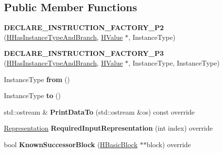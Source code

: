 \subsection*{Public Member Functions}
\begin{DoxyCompactItemize}
\item 
{\bfseries D\+E\+C\+L\+A\+R\+E\+\_\+\+I\+N\+S\+T\+R\+U\+C\+T\+I\+O\+N\+\_\+\+F\+A\+C\+T\+O\+R\+Y\+\_\+\+P2} (\hyperlink{classv8_1_1internal_1_1_h_has_instance_type_and_branch}{H\+Has\+Instance\+Type\+And\+Branch}, \hyperlink{classv8_1_1internal_1_1_h_value}{H\+Value} $\ast$, Instance\+Type)\hypertarget{classv8_1_1internal_1_1_h_has_instance_type_and_branch_ad394fbeed99933d49a193007a842a3f2}{}\label{classv8_1_1internal_1_1_h_has_instance_type_and_branch_ad394fbeed99933d49a193007a842a3f2}

\item 
{\bfseries D\+E\+C\+L\+A\+R\+E\+\_\+\+I\+N\+S\+T\+R\+U\+C\+T\+I\+O\+N\+\_\+\+F\+A\+C\+T\+O\+R\+Y\+\_\+\+P3} (\hyperlink{classv8_1_1internal_1_1_h_has_instance_type_and_branch}{H\+Has\+Instance\+Type\+And\+Branch}, \hyperlink{classv8_1_1internal_1_1_h_value}{H\+Value} $\ast$, Instance\+Type, Instance\+Type)\hypertarget{classv8_1_1internal_1_1_h_has_instance_type_and_branch_ad592e646150f3fd8837fa5bfa49e0c93}{}\label{classv8_1_1internal_1_1_h_has_instance_type_and_branch_ad592e646150f3fd8837fa5bfa49e0c93}

\item 
Instance\+Type {\bfseries from} ()\hypertarget{classv8_1_1internal_1_1_h_has_instance_type_and_branch_a191c291692415470754a5b9a9378a5cd}{}\label{classv8_1_1internal_1_1_h_has_instance_type_and_branch_a191c291692415470754a5b9a9378a5cd}

\item 
Instance\+Type {\bfseries to} ()\hypertarget{classv8_1_1internal_1_1_h_has_instance_type_and_branch_a21dade8484f8749af30a0eeb4f24be68}{}\label{classv8_1_1internal_1_1_h_has_instance_type_and_branch_a21dade8484f8749af30a0eeb4f24be68}

\item 
std\+::ostream \& {\bfseries Print\+Data\+To} (std\+::ostream \&os) const  override\hypertarget{classv8_1_1internal_1_1_h_has_instance_type_and_branch_ad73bb2e0e7989c957b10d7a488dc5934}{}\label{classv8_1_1internal_1_1_h_has_instance_type_and_branch_ad73bb2e0e7989c957b10d7a488dc5934}

\item 
\hyperlink{classv8_1_1internal_1_1_representation}{Representation} {\bfseries Required\+Input\+Representation} (int index) override\hypertarget{classv8_1_1internal_1_1_h_has_instance_type_and_branch_a75d5dee5b0382b92bc64b9b928e89d9d}{}\label{classv8_1_1internal_1_1_h_has_instance_type_and_branch_a75d5dee5b0382b92bc64b9b928e89d9d}

\item 
bool {\bfseries Known\+Successor\+Block} (\hyperlink{classv8_1_1internal_1_1_h_basic_block}{H\+Basic\+Block} $\ast$$\ast$block) override\hypertarget{classv8_1_1internal_1_1_h_has_instance_type_and_branch_ae8cdd39fc12cd7058ff5947b6e8a7e4b}{}\label{classv8_1_1internal_1_1_h_has_instance_type_and_branch_ae8cdd39fc12cd7058ff5947b6e8a7e4b}

\end{DoxyCompactItemize}
